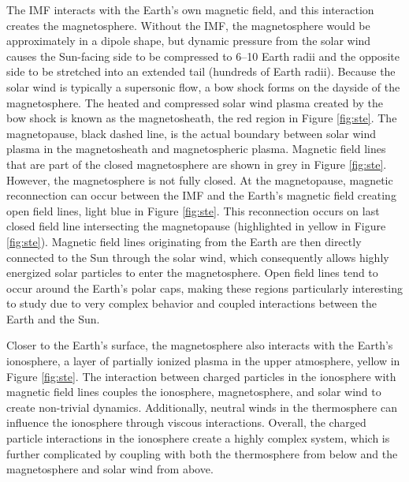 The IMF interacts with the Earth's own magnetic field, and this interaction creates the magnetosphere.  Without the IMF, the magnetosphere would be approximately in a dipole shape, but dynamic pressure from the solar wind causes the Sun-facing side to be compressed to 6--10 Earth radii and the opposite side to be stretched into an extended tail (hundreds of Earth radii).  Because the solar wind is typically a supersonic flow, a bow shock forms on the dayside of the magnetosphere.  The heated and compressed solar wind plasma created by the bow shock is known as the magnetosheath, the red region in Figure \ref{fig:ste}.  The magnetopause, black dashed line, is the actual boundary between solar wind plasma in the magnetosheath and magnetospheric plasma.  Magnetic field lines that are part of the closed magnetosphere are shown in grey in Figure \ref{fig:ste}.  However, the magnetosphere is not fully closed.  At the magnetopause, magnetic reconnection can occur between the IMF and the Earth's magnetic field creating open field lines, light blue in Figure \ref{fig:ste}.  This reconnection occurs on last closed field line intersecting the magnetopause (highlighted in yellow in Figure \ref{fig:ste}).  Magnetic field lines originating from the Earth are then directly connected to the Sun through the solar wind, which consequently allows highly energized solar particles to enter the magnetosphere.  Open field lines tend to occur around the Earth's polar caps, making these regions particularly interesting to study due to very complex behavior and coupled interactions between the Earth and the Sun.

Closer to the Earth's surface, the magnetosphere also interacts with the Earth's ionosphere, a layer of partially ionized plasma in the upper atmosphere, yellow in Figure \ref{fig:ste}.  The interaction between charged particles in the ionosphere with magnetic field lines couples the ionosphere, magnetosphere, and solar wind to create non-trivial dynamics.  Additionally,  neutral winds in the thermosphere can influence the ionosphere through viscous interactions.  Overall, the charged particle interactions in the ionosphere create a highly complex system, which is further complicated by coupling with both the thermosphere from below and the magnetosphere and solar wind from above.  

